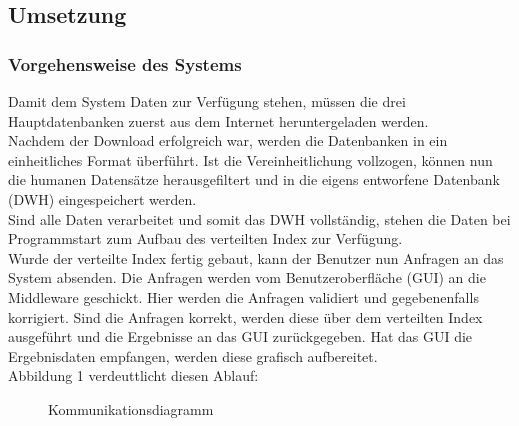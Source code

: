 \newpage
\subsection{Umsetzung}
\subsubsection{Vorgehensweise des Systems}
Damit dem System Daten zur Verfügung stehen, müssen die drei Hauptdatenbanken zuerst aus dem Internet heruntergeladen werden.\\
Nachdem der Download erfolgreich war, werden die Datenbanken in ein einheitliches Format überführt. Ist die Vereinheitlichung vollzogen, können nun die humanen Datensätze herausgefiltert und in die eigens entworfene Datenbank (DWH) eingespeichert werden.
\\
Sind alle Daten verarbeitet und somit das DWH vollständig, stehen die Daten bei Programmstart zum Aufbau des verteilten Index zur Verfügung. \\
Wurde der verteilte Index fertig gebaut, kann der Benutzer nun Anfragen an das System absenden. Die Anfragen werden vom Benutzeroberfläche (GUI) an die Middleware geschickt. Hier werden die Anfragen validiert und gegebenenfalls korrigiert. Sind die Anfragen korrekt, werden diese über dem verteilten Index ausgeführt und die Ergebnisse an das GUI zurückgegeben. Hat das GUI die Ergebnisdaten empfangen, werden diese grafisch aufbereitet.\\
Abbildung 1 verdeuttlicht diesen Ablauf:\\
\begin{figure}[H]
\centering
{}
  \caption{Kommunikationsdiagramm}
  \label{fig:Kommunikationsdiagramm}
\end{figure}
\newpage
